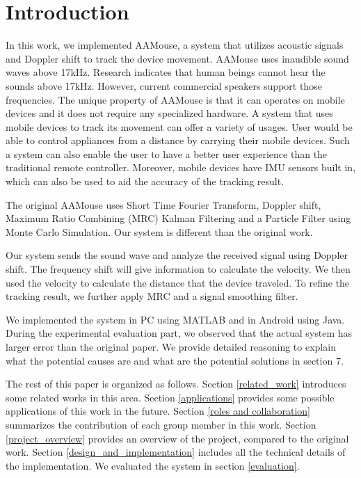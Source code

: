 \documentclass{acm_proc_article-sp}
\begin{document}
\section{Introduction}
In this work, we implemented AAMouse, a system that utilizes
acoustic signals and Doppler shift to track the device movement.
AAMouse uses inaudible sound waves above 17kHz.
Research indicates that human beings cannot hear the sounds above
17kHz. However, current commercial speakers support those frequencies.
The unique property of AAMouse is that it can operates on mobile 
devices and it does not require any specialized hardware. A system
that uses mobile devices to track its movement can offer a variety
of usages. User would be able to control appliances from a distance by carrying their mobile devices. Such a system can also 
enable the user to have a better user experience than the traditional
remote controller. Moreover, mobile devices have IMU sensors built in,
which can also be used to aid the accuracy of the tracking result.

The original AAMouse uses Short Time Fourier Transform, Doppler shift, Maximum Ratio 
Combining (MRC) Kalman Filtering and a
Particle Filter using Monte Carlo Simulation. Our system is different than the original work. 

Our system sends the sound wave and analyze the received signal using
Doppler shift. The frequency shift will give information to 
calculate the velocity. We then used the velocity to calculate the
distance that the device traveled. To refine the tracking result,
we further apply MRC and a signal smoothing
filter. 

We implemented the system in PC using MATLAB and in Android using
Java. During the 
experimental evaluation part, we observed that the actual system has
larger error than the original paper.
We provide detailed
reasoning to explain what the potential causes are and what are the
potential solutions in section 7.

The rest of this paper is organized as follows.
Section
\ref{related_work} introduces some related works in this area.
Section \ref{applications} provides some possible applications of
this work in the future. Section \ref{roles and collaboration}
summarizes the contribution of each group member in this work. 
Section \ref{project_overview} provides an overview of the project,
compared to the original work. Section \ref{design_and_implementation}
includes all the technical details of the implementation. We evaluated
the system in section \ref{evaluation}.
\end{document}
